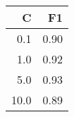 \begin{tabular}{rr}
\toprule
    C &    F1 \\
\midrule
  0.1 &  0.90 \\
  1.0 &  0.92 \\
  5.0 &  0.93 \\
 10.0 &  0.89 \\
\bottomrule
\end{tabular}
